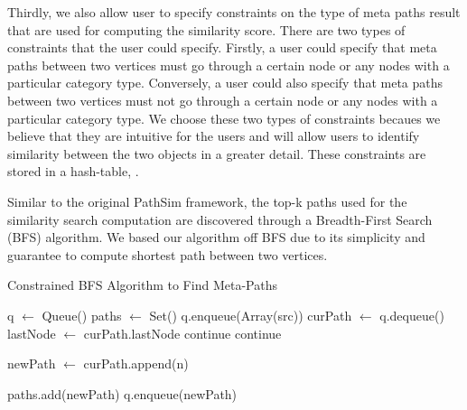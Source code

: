 Thirdly, we also allow user to specify constraints on the type of meta paths
result that are used for computing the similarity score. There are two types of
constraints that the user could specify. Firstly, a user could specify that
meta paths between two vertices must go through a certain node or any nodes
with a particular category type. Conversely,  a user could also specify that
meta paths between two vertices must not go through a certain node or any nodes
with a particular category type. We choose these two types of constraints
becaues we believe that they are intuitive for the users and will allow users
to identify similarity between the two objects in a greater detail. These
constraints are stored in a hash-table, \cTable.

Similar to the original PathSim framework, the top-k paths used for the
similarity search computation are discovered through a Breadth-First Search
(BFS) algorithm. We based our algorithm off BFS due to its simplicity and guarantee to
compute shortest path between two vertices.

\begin{algorithm}
    \caption{Constrained BFS Algorithm to Find Meta-Paths}
    \label{alg:1}
    \begin{algorithmic}[1]
            \State q $\gets$ Queue()
            \State paths $\gets$ Set()
            \State q.enqueue(Array(src))
            \State
                \State curPath $\gets$ q.dequeue()
                \State lastNode $\gets$ curPath.lastNode
                        \State continue
                        \State continue
                    \EndIf
                    \State

                    \State newPath $\gets$ curPath.append(n)

                            \State paths.add(newPath)
                        \EndIf
                    \Else
                        \State q.enqueue(newPath)
                    \EndIf
                \EndFor
            \EndWhile
            \State
            \State {}
        \EndFunction
    \end{algorithmic}
\end{algorithm}


